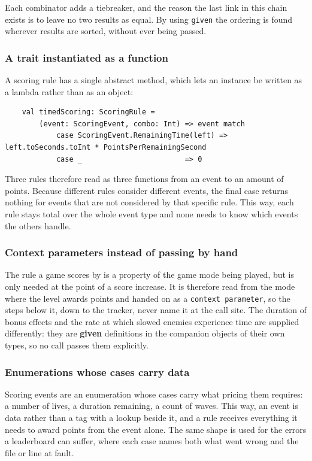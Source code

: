 Each combinator adds a tiebreaker, and the reason the last link in this chain exists is to leave no two results as
equal. By using \texttt{given} the ordering is found wherever results are sorted, without ever being passed.

\subsubsection{A trait instantiated as a function}

A scoring rule has a single abstract method, which lets an instance be written as a lambda rather than as an object:

\begin{lstlisting}
    val timedScoring: ScoringRule =
        (event: ScoringEvent, combo: Int) => event match
            case ScoringEvent.RemainingTime(left) => left.toSeconds.toInt * PointsPerRemainingSecond
            case _                        => 0
\end{lstlisting}

Three rules therefore read as three functions from an event to an amount of points. Because different rules consider
different events, the final case returns nothing for events that are not considered by that specific rule. This way,
each rule stays total over the whole event type and none needs to know which events the others handle.

\subsubsection{Context parameters instead of passing by hand}

The rule a game scores by is a property of the game mode being played, but is only needed at the point of a score increase.
It is therefore read from the mode where the level awards points and handed on as a \texttt{context parameter}, so the
steps below it, down to the tracker, never name it at the call site. The duration of bonus effects and the rate at which
slowed enemies experience time are supplied differently: they are \textbf{given} definitions in the companion objects of
their own types, so no call passes them explicitly.

\subsubsection{Enumerations whose cases carry data}

Scoring events are an enumeration whose cases carry what pricing them requires: a number of lives, a duration
remaining, a count of waves. This way, an event is data rather than a tag with a lookup beside it, and a rule
receives everything it needs to award points from the event alone. The same shape is used for the errors a leaderboard
can suffer, where each case names both what went wrong and the file or line at fault.

